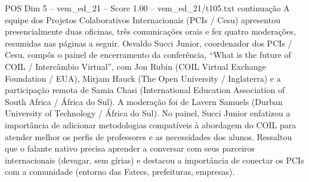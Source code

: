\begin{textsample}{POS Dim 5 – vem\_ed\_21 – Score 1.00 – vem\_ed\_21/t105.txt}  \label{ex:f5_pos_090}
continuação A equipe dos Projetos Colaborativos Internacionais (PCIs / Cesu) apresentou presencialmente duas oficinas, três comunicações orais e fez quatro moderações, resumidas nas páginas a seguir.
Osvaldo Succi Junior, coordenador dos PCIs / Cesu, compôs o painel de encerramento da conferência, “What is the future of COIL / Intercâmbio Virtual”, com Jon Rubin (COIL Virtual Exchange Foundation / EUA), Mirjam Hauck (The Open University / Inglaterra) e a participação remota de Samia Chasi (International Education Association of South Africa / África do Sul).
A moderação foi de Lavern Samuels (Durban University of Technology / África do Sul).
No painel, Succi Junior enfatizou a importância de adicionar metodologias compatíveis à abordagem do COIL para atender melhor os perfis de professores e as necessidades dos alunos.
Ressaltou que o falante nativo precisa aprender a conversar com seus parceiros internacionais (devagar, sem gírias) e destacou a importância de conectar os PCIs com a comunidade (entorno das Fatecs, prefeituras, empresas).

\end{textsample}
